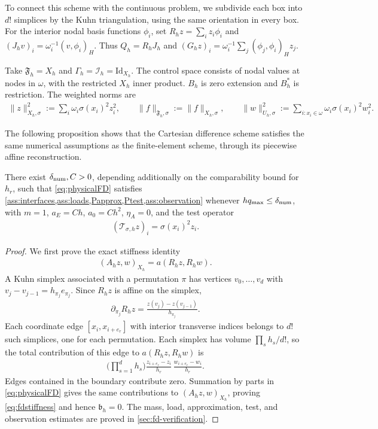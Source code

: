 \documentclass[print,wide,eng]{draft}
\begin{document}
To connect this scheme with the continuous problem, we subdivide each box into $d!$ simplices by the Kuhn triangulation, using the same orientation in every box.
For the interior nodal basis functions $\phi_i$, set $R_hz=\sum\limits_i z_i\phi_i$ and $(J_hv)_i=\omega_i^{-1}(v,\phi_i)_H$.
Thus $Q_h=R_hJ_h$ and $(G_hz)_i=\omega_i^{-1}\sum\limits_j(\phi_j,\phi_i)_Hz_j$.

Take $\mathfrak F_h=X_h$ and $\Gamma_h=\mathcal I_h=\mathrm{Id}_{X_h}$. The control space consists of nodal values at nodes in $\omega$, with the restricted $X_h$ inner product. $B_h$ is zero extension and $B_h^*$ is restriction.
The weighted norms are
%
\begin{align*}
\|z\|_{X_h,\sigma}^2:=\sum_i\omega_i\sigma(x_i)^2z_i^2,\qquad
\|f\|_{\mathfrak F_h,\sigma}:=\|f\|_{X_h,\sigma},\qquad
\|w\|_{U_h,\sigma}^2:=\sum_{i:x_i\in\omega}\omega_i\sigma(x_i)^2w_i^2.
\end{align*}
%

The following proposition shows that the Cartesian difference scheme satisfies the same numerical assumptions as the finite-element scheme, through its piecewise affine reconstruction.
%
\begin{proposition}\label{prop:fd}
There exist $\delta_{\rm num},C>0$, depending additionally on the comparability bound for $h_r$, such that \cref{eq:physicalFD} satisfies \cref{ass:interfaces,ass:loads,Papprox,Ptest,ass:observation} whenever $hq_{\max}\leq\delta_{\rm num}$, with $m=1$, $a_E=Ch$, $a_0=Ch^2$, $\eta_A=0$, and the test operator\vspace{-2mm}
%
\begin{align*}
(\mathscr{T}_{\sigma,h}z)_i=\sigma(x_i)^2z_i.
\end{align*}
%
\end{proposition}
%
\begin{proof}
We first prove the exact stiffness identity\vspace{-2mm}
%
\begin{align}\label{eq:fdstiffness}
(A_hz,w)_{X_h}=a(R_hz,R_hw).
\end{align}
%
A Kuhn simplex associated with a permutation $\pi$ has vertices $v_0,\ldots,v_d$ with $v_j-v_{j-1}=h_{\pi_j}e_{\pi_j}$. Since $R_hz$ is affine on the simplex,\vspace{-2mm}
%
\begin{align*}
\partial_{\pi_j}R_hz=\frac{z(v_j)-z(v_{j-1})}{h_{\pi_j}}.
\end{align*}
%
Each coordinate edge $[x_i,x_{i+e_r}]$ with interior transverse indices belongs to $d!$ such simplices, one for each permutation. Each simplex has volume $\prod_s h_s/d!$, so the total contribution of this edge to $a(R_hz,R_hw)$ is
%
\begin{align*}
\biggl(\prod_{s=1}^d h_s\biggr)
\frac{z_{i+e_r}-z_i}{h_r}\,
\frac{w_{i+e_r}-w_i}{h_r}.
\end{align*}
%
Edges contained in the boundary contribute zero. Summation by parts in \cref{eq:physicalFD} gives the same contributions to $(A_hz,w)_{X_h}$, proving \cref{eq:fdstiffness} and hence $\mathfrak b_h=0$. The mass, load, approximation, test, and observation estimates are proved in \cref{sec:fd-verification}.
\end{proof}
%
\end{document}
